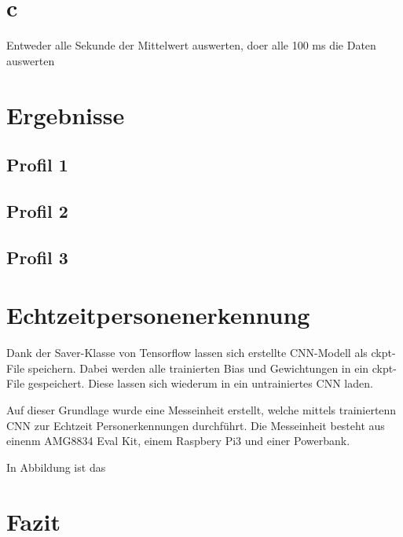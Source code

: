 \section{c}

Entweder alle Sekunde der Mittelwert auswerten, doer alle 100 ms die Daten auswerten 

\section{Ergebnisse}


\subsection{Profil 1}


\subsection{Profil 2}


\subsection{Profil 3}


\section{Echtzeitpersonenerkennung}

Dank der Saver-Klasse von Tensorflow lassen sich erstellte CNN-Modell als ckpt-File speichern. Dabei werden alle trainierten Bias und Gewichtungen in ein ckpt-File gespeichert. Diese lassen sich wiederum in ein untrainiertes CNN laden.

Auf dieser Grundlage wurde eine Messeinheit erstellt, welche mittels trainiertenn CNN zur Echtzeit Personerkennungen durchführt. Die Messeinheit besteht aus einenm AMG8834 Eval Kit, einem Raspbery Pi3 und einer Powerbank.

In Abbildung ist das 



 

\section{Fazit}




